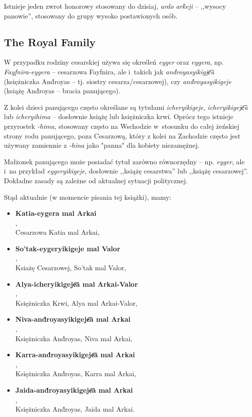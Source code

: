 Istnieje jeden zwrot honorowy stosowany do dzisiaj, \emph{ardo arḱeji} --
,,wysocy panowie'', stosowany do grupy wysoko postawionych osób.

\subsection{The Royal Family}

W przypadku rodziny cesarskiej używa się określeń \emph{eyger} oraz
\emph{eygera}, np. \emph{Fayfnira-eygera} -- cesarzowa Fayfnira, ale i~takich
jak \emph{and́royasyikigje͞a} (księżniczka And́royas -- tj. siostry
cesarza/cesarzowej), czy \emph{and́royasyikigeje} (książę And́royas -- bracia
panującego).

Z kolei dzieci panującego często określane są tytułami \emph{icheryikigeje},
\emph{icheryikigeje͞a} lub \emph{icheryihima} -- dosłownie książę lub
księżniczka krwi. Oprócz tego istnieje przyrostek \emph{-hima}, stosowany często
na Wschodzie w~stosunku do całej żeńskiej strony rodu panującego, poza
Cesarzową, który z kolei na Zachodzie często jest używany zamiennie z
\emph{-hina} jako "panna" dla kobiety niezamężnej.

Małżonek panującego może posiadać tytuł zarówno równorzędny -- np. \emph{eyger},
ale i~na przykład \emph{eygeryikigeje}, dosłownie ,,książę cesarstwa'' lub
,,książę cesarzowej''. Dokładne zasady są zależne od aktualnej sytuacji
politycznej.

Stąd aktualnie (w momencie pisania tej książki), mamy:

\begin{itemize}
    \item \textbf{Katia-eygera mal Arkai}\\ ,\\
          Cesarzowa Katia mal Arkai,
    \item \textbf{So'tak-eygeryikigeje mal Valor}\\ ,\\ Ksiażę Cesarzowej, So'tak mal Valor,
    \item \textbf{Alya-icheryikigeje͞a mal Arkai-Valor}\\,\\ Księżniczka Krwi, Alya mal Arkai-Valor,
    \item \textbf{Niva-and́royasyikigeje͞a mal Arkai}\\,\\ Księżniczka And́royas, Niva mal Arkai,
    \item \textbf{Karra-and́royasyikigeje͞a mal Arkai}\\,\\ Księżniczka And́royas, Karra mal Arkai,
    \item \textbf{Jaida-and́royasyikigeje͞a mal Arkai}\\,\\ Księżniczka And́royas, Jaida mal Arkai.
\end{itemize}

